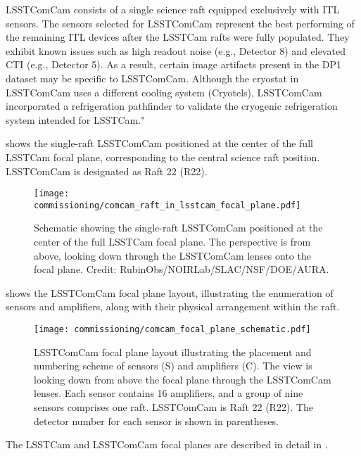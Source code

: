 LSSTComCam consists of a single science raft equipped exclusively with \gls{ITL} sensors.
The sensors selected for \gls{LSSTComCam} represent  the best performing of the remaining ITL devices after the LSSTCam rafts were fully populated. 
They  exhibit known issues such as high readout noise (e.g., Detector 8) and elevated \gls{CTI} (e.g., Detector 5).
As a result, certain image artifacts present in the \gls{DP1} dataset may be specific to LSSTComCam.
Although the cryostat in LSSTComCam uses a different cooling system (Cryotels), LSSTComCam incorporated a refrigeration pathfinder to validate the cryogenic refrigeration system intended for LSSTCam."

 shows the single-raft \gls{LSSTComCam} positioned at the center of the full LSSTCam focal plane, corresponding to the central science raft position.
\gls{LSSTComCam} is designated as Raft 22 (R22).
\begin{figure}[htb]
\centering
\texttt{[image: commissioning/comcam\_raft\_in\_lsstcam\_focal\_plane.pdf]}
\caption{Schematic showing the single-raft \gls{LSSTComCam} positioned at the center of the full LSSTCam focal plane. The perspective is from above, looking down through the \gls{LSSTComCam} lenses onto the focal plane. Credit: RubinObs/NOIRLab/SLAC/NSF/DOE/AURA.}
\label{fig:comcam_raft_in_lsstcam_focal_plane}
\vspace{0.1cm}
\end{figure}

 shows the \gls{LSSTComCam} focal plane layout, illustrating the enumeration of sensors and amplifiers, along with their physical arrangement within the raft.
\begin{figure}[htb!]
\centering
\texttt{[image: commissioning/comcam\_focal\_plane\_schematic.pdf]}
\caption{LSSTComCam focal plane layout illustrating the placement and numbering scheme of sensors (S) and amplifiers (C). The view is looking down from above the focal plane through the \gls{LSSTComCam} lenses. Each sensor contains 16 amplifiers, and a group of nine sensors comprises one raft. \gls{LSSTComCam} is Raft 22 (R22). The detector number for each sensor is shown in parentheses.}
\label{fig:comcam_focal_plane}
\vspace{0.1cm}
\end{figure}
The LSSTCam and \gls{LSSTComCam} focal planes are described in detail in \cite{ctn001}.


